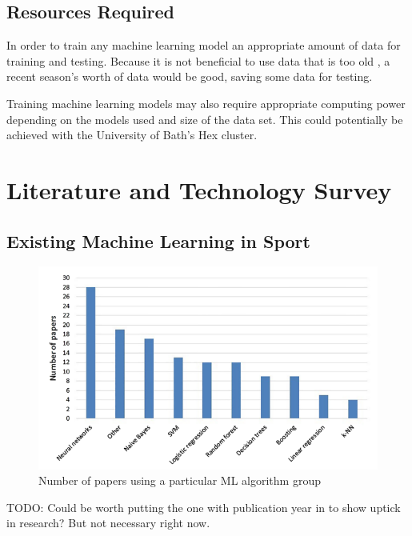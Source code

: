 \documentclass[12pt,a4paper]{report}
\theoremstyle{definition}
\begin{document}
\section{Resources Required}

In order to train any machine learning model an appropriate amount of data for training and testing. 
Because it is not beneficial to use data that is too old \citep{horvat2020}, a recent season's worth of data would be good, saving some data for testing. 

Training machine learning models may also require appropriate computing power depending on the models used and size of the data set. 
This could potentially be achieved with the University of Bath's Hex cluster.

\chapter{Literature and Technology Survey}

\section{Existing Machine Learning in Sport}

\begin{figure}[H]
    \centering
    \includegraphics[width=\linewidth]{Horvat&Job_Figure2.png}
    \caption{Number of papers using a particular ML algorithm group \citep{horvat2020}}
    \label{fig:NoPapers}
\end{figure}

TODO: Could be worth putting the one with publication year in to show uptick in research? But not necessary right now.
\end{document}
